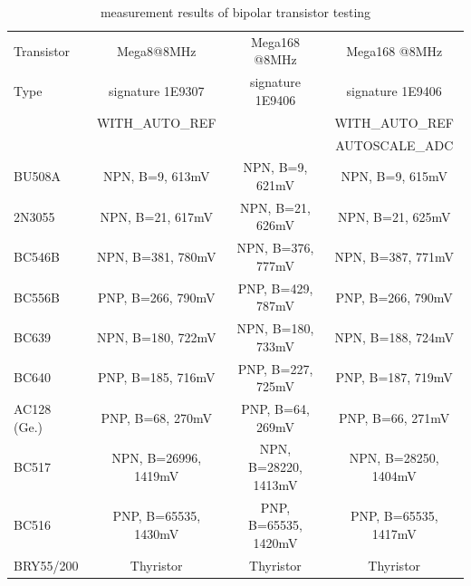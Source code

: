 \begin{table}[H]
  \begin{center}
    \begin{tabular}{| l | c | c | c |}
    \hline
     Transistor & Mega8@8MHz & Mega168 @8MHz & Mega168 @8MHz \\
     Type   & signature 1E9307 & signature 1E9406 & signature 1E9406 \\
           & WITH\_AUTO\_REF &  & WITH\_AUTO\_REF \\
           &                 &  & AUTOSCALE\_ADC \\
    \hline
    \hline
BU508A & NPN, B=9, 613mV & NPN, B=9, 621mV & NPN, B=9, 615mV\\
    \hline
2N3055 & NPN, B=21, 617mV & NPN, B=21, 626mV & NPN, B=21, 625mV\\
    \hline
BC546B & NPN, B=381, 780mV & NPN, B=376, 777mV & NPN, B=387, 771mV\\
    \hline
BC556B & PNP, B=266, 790mV & PNP, B=429, 787mV & PNP, B=266, 790mV\\
    \hline
BC639 & NPN, B=180, 722mV & NPN, B=180, 733mV & NPN, B=188, 724mV\\

    \hline
BC640 & PNP, B=185, 716mV & PNP, B=227, 725mV & PNP, B=187, 719mV\\
    \hline
AC128 (Ge.) & PNP, B=68, 270mV & PNP, B=64, 269mV & PNP, B=66, 271mV\\
    \hline
BC517 & NPN, B=26996, 1419mV & NPN, B=28220, 1413mV & NPN, B=28250, 1404mV\\
    \hline
BC516 & PNP, B=65535, 1430mV & PNP, B=65535, 1420mV & PNP, B=65535, 1417mV\\
    \hline
BRY55/200 & Thyristor & Thyristor & Thyristor\\
    \hline
    \end{tabular}
  \end{center}
  \caption{measurement results of bipolar transistor testing}
  \label{tab:bipolar} 
\end{table}

